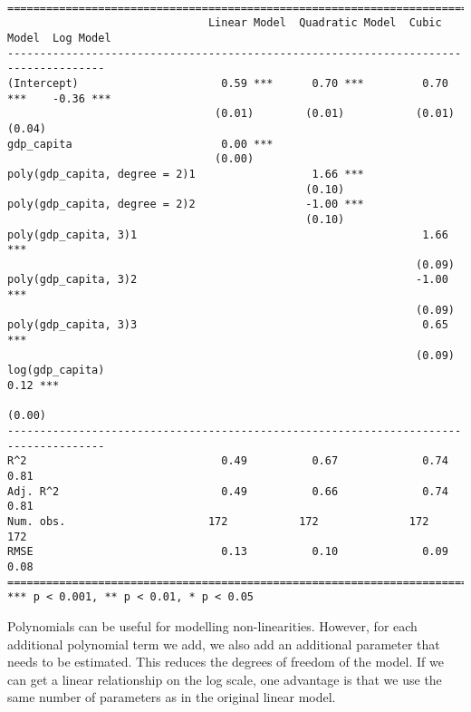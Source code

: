 \documentclass[]{article}
\begin{document}
\begin{verbatim}

=====================================================================================
                               Linear Model  Quadratic Model  Cubic Model  Log Model 
-------------------------------------------------------------------------------------
(Intercept)                      0.59 ***      0.70 ***         0.70 ***    -0.36 ***
                                (0.01)        (0.01)           (0.01)       (0.04)   
gdp_capita                       0.00 ***                                            
                                (0.00)                                               
poly(gdp_capita, degree = 2)1                  1.66 ***                              
                                              (0.10)                                 
poly(gdp_capita, degree = 2)2                 -1.00 ***                              
                                              (0.10)                                 
poly(gdp_capita, 3)1                                            1.66 ***             
                                                               (0.09)                
poly(gdp_capita, 3)2                                           -1.00 ***             
                                                               (0.09)                
poly(gdp_capita, 3)3                                            0.65 ***             
                                                               (0.09)                
log(gdp_capita)                                                              0.12 ***
                                                                            (0.00)   
-------------------------------------------------------------------------------------
R^2                              0.49          0.67             0.74         0.81    
Adj. R^2                         0.49          0.66             0.74         0.81    
Num. obs.                      172           172              172          172       
RMSE                             0.13          0.10             0.09         0.08    
=====================================================================================
*** p < 0.001, ** p < 0.01, * p < 0.05
\end{verbatim}

Polynomials can be useful for modelling non-linearities. However, for each additional polynomial term we add, we also add an additional parameter that needs to be estimated. This reduces the degrees of freedom of the model. If we can get a linear relationship on the log scale, one advantage is that we use the same number of parameters as in the original linear model.
\end{document}
